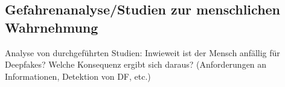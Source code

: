\subsection{Gefahrenanalyse/Studien zur menschlichen Wahrnehmung}
Analyse von durchgeführten Studien: Inwieweit ist der Mensch anfällig für Deepfakes?
Welche Konsequenz ergibt sich daraus? (Anforderungen an Informationen, Detektion von DF, etc.)
